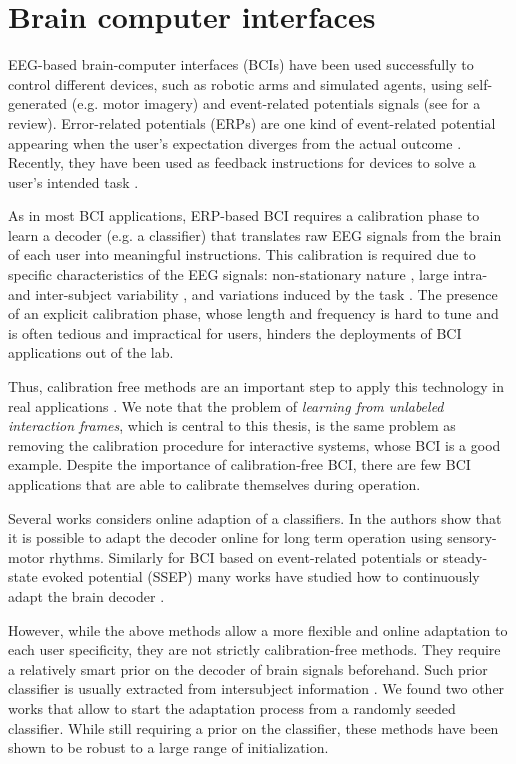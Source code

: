\section{Brain computer interfaces}

EEG-based brain-computer interfaces (BCIs) have been used successfully to control different devices, such as robotic arms and simulated agents, using self-generated (e.g. motor imagery) and event-related potentials signals (see \cite{millan10} for a review). Error-related potentials (ERPs) are one kind of event-related potential appearing when the user's expectation diverges from the actual outcome \cite{Falkenstein00,chavarriaga2014errare}. Recently, they have been used as feedback instructions for devices to solve a user's intended task \cite{chavarriaga2010learning,iturrate13}.

As in most BCI applications, ERP-based BCI requires a calibration phase to learn a decoder (e.g. a classifier) that translates raw EEG signals from the brain of each user into meaningful instructions. This calibration is required due to specific characteristics of the EEG signals: non-stationary nature \cite{vidaurre11}, large intra- and inter-subject variability \cite{Polich1997}, and variations induced by the task \cite{IturrateErrP13}. The presence of an explicit calibration phase, whose length and frequency is hard to tune and is often tedious and impractical for users, hinders the deployments of BCI applications out of the lab. 

Thus, calibration free methods are an important step to apply this technology in real applications \cite{millan10}. We note that the problem of \emph{learning from unlabeled interaction frames}, which is central to this thesis, is the same problem as removing the calibration procedure for interactive systems, whose BCI is a good example. Despite the importance of calibration-free BCI, there are few BCI applications that are able to calibrate themselves during operation.

Several works considers online adaption of a classifiers. In \cite{vidaurre2010towards} the authors show that it is possible to adapt the decoder online for long term operation using sensory-motor rhythms. Similarly for BCI based on
event-related potentials or steady-state evoked potential (SSEP) many works have studied how to continuously adapt the brain decoder \cite{fazli2009subject,lu2009unsupervised,fazli2011l1,congedo2013new,schettini2014self}.

However, while the above methods allow a more flexible and online adaptation to each user specificity, they are not strictly calibration-free methods. They require a relatively smart prior on the decoder of brain signals beforehand. Such prior classifier is usually extracted from intersubject information \cite{fazli2009subject,lu2009unsupervised,vidaurre2010towards}. We found two other works that allow to start the adaptation process from a randomly seeded classifier. While still requiring a prior on the classifier, these methods have been shown to be robust to a large range of initialization.

